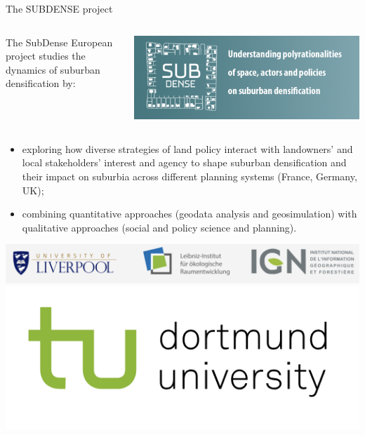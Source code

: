\documentclass{beamer}
\begin{document}
\begin{frame}{The SUBDENSE project}


\begin{columns}
	\begin{column}{0.6\textwidth}
		The SubDense European project studies the dynamics of suburban densification by:
 
	\end{column}
	\begin{column}{0.4\textwidth}
		\includegraphics[height=0.2\textheight]{figures/subdense.png}
	\end{column}
\end{columns}


\begin{itemize} 
	\item exploring how diverse strategies of land policy interact with landowners’ and local stakeholders’ interest and agency to shape suburban densification and their impact on suburbia across different planning systems (France, Germany, UK);
	\item combining quantitative approaches (geodata analysis and geosimulation) with qualitative approaches (social and policy science and planning).
\end{itemize}


\includegraphics[height=0.1\textheight]{figures/logos.png}\hspace{-0.1cm}
\includegraphics[height=0.1\textheight]{figures/tud.png}



\end{frame}
\end{document}
